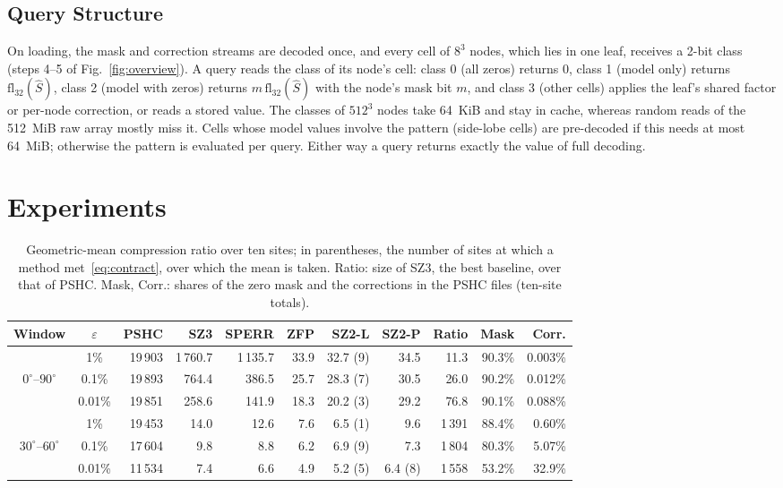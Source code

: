 \documentclass[conference]{IEEEtran}
\newcommand{\fl}{\mathrm{fl}_{32}}
\begin{document}
\subsection{Query Structure}

On loading, the mask and correction streams are decoded once, and every cell of $8^3$ nodes, which lies in one leaf, receives a 2-bit class (steps 4--5 of Fig.~\ref{fig:overview}). A query reads the class of its node's cell: class 0 (all zeros) returns 0, class 1 (model only) returns $\fl(\hat S)$, class 2 (model with zeros) returns $m\,\fl(\hat S)$ with the node's mask bit $m$, and class 3 (other cells) applies the leaf's shared factor or per-node correction, or reads a stored value. The classes of $512^3$ nodes take 64~KiB and stay in cache, whereas random reads of the 512~MiB raw array mostly miss it. Cells whose model values involve the pattern (side-lobe cells) are pre-decoded if this needs at most 64~MiB; otherwise the pattern is evaluated per query. Either way a query returns exactly the value of full decoding.

\section{Experiments}\label{sec:exp}

\begin{table}[t]
\caption{Geometric-mean compression ratio over ten sites; in parentheses, the number of sites at which a method met~\eqref{eq:contract}, over which the mean is taken. Ratio: size of SZ3, the best baseline, over that of PSHC. Mask, Corr.: shares of the zero mask and the corrections in the PSHC files (ten-site totals).}
\label{tab:cr}
\centering
\footnotesize
\setlength{\tabcolsep}{5pt}
\begin{tabular}{ccrrrrrrrrr}
\hline
Window & $\varepsilon$ & PSHC & SZ3 & SPERR & ZFP & SZ2-L & SZ2-P & Ratio & Mask & Corr.\\
\hline
 & 1\% & 19\,903 & 1\,760.7 & 1\,135.7 & 33.9 & 32.7 (9) & 34.5 & 11.3 & 90.3\% & 0.003\%\\
$0^\circ$--$90^\circ$ & 0.1\% & 19\,893 & 764.4 & 386.5 & 25.7 & 28.3 (7) & 30.5 & 26.0 & 90.2\% & 0.012\%\\
 & 0.01\% & 19\,851 & 258.6 & 141.9 & 18.3 & 20.2 (3) & 29.2 & 76.8 & 90.1\% & 0.088\%\\
\hline
 & 1\% & 19\,453 & 14.0 & 12.6 & 7.6 & 6.5 (1) & 9.6 & 1\,391 & 88.4\% & 0.60\%\\
$30^\circ$--$60^\circ$ & 0.1\% & 17\,604 & 9.8 & 8.8 & 6.2 & 6.9 (9) & 7.3 & 1\,804 & 80.3\% & 5.07\%\\
 & 0.01\% & 11\,534 & 7.4 & 6.6 & 4.9 & 5.2 (5) & 6.4 (8) & 1\,558 & 53.2\% & 32.9\%\\
\hline
\end{tabular}
\end{table}
\end{document}
